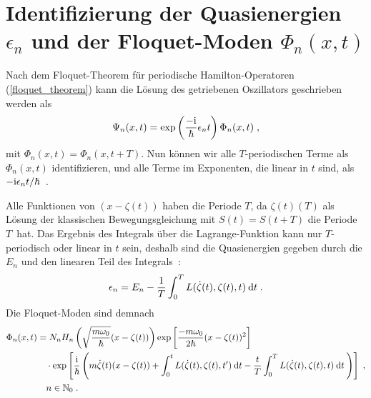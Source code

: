       \section{\texorpdfstring{Identifizierung der Quasienergien $\epsilon_n$ und der Floquet-Moden $\Phi_n(x,t)$}{Identifizierung der Quasienergien epsilon_n und der Floquet-Moden Phi_n(x,t)}}
        Nach dem Floquet-Theorem für periodische Hamilton-Operatoren (\ref{floquet_theorem}) kann die Lösung des getriebenen Oszillators geschrieben werden als
        \begin{equation}
          \Psi_n(x,t) = \exp\left(\frac{-\text i}{\hbar}\epsilon_nt\right)\Phi_n(x,t) \; ,
        \end{equation}
        mit $\Phi_n(x,t)=\Phi_n(x,t+T)$.
        Nun können wir alle $T$-periodischen Terme als $\Phi_n(x,t)$ identifizieren, und alle Terme im Exponenten, die linear in $t$ sind, als $-\text i\epsilon_n t/\hbar$~\cite{haengi}.

        Alle Funktionen von $(x-\zeta(t))$ haben die Periode $T$, da $\zeta(t)(T)$ als Lösung der klassischen Bewegungsgleichung mit $S(t)=S(t+T)$ die Periode $T$ \,hat. Das
        Ergebnis des Integrals über die Lagrange-Funktion kann nur $T$-periodisch oder linear in $t$ sein, deshalb sind die Quasienergien gegeben durch die $E_n$ und den linearen Teil des Integrals~\cite{haengi}:
        \begin{equation}
          \epsilon_n = E_n - \frac{1}{T} \int_0^T L(\dot \zeta(t), \zeta(t), t) \: \text d t \; .
          \label{ep}
        \end{equation}
        Die Floquet-Moden sind demnach
        \begin{align}
            \Phi_n(x,t) &=
             N_nH_n\left(\sqrt{\frac{m\omega_0}{\hbar}}(x-\zeta(t))\right) \exp\left[\frac{-m\omega_0}{2\hbar}(x-\zeta(t))^2\right] \notag\\
            &\quad \cdot \exp\left[\frac{\text i}{\hbar}\left(m\dot \zeta(t)(x-\zeta(t))+\int_0^tL(\dot \zeta(t),\zeta(t),t')\:\text d t-\frac{t}{T} \int_0^T L(\dot \zeta(t),\zeta(t),t)\:\text dt\: \right)\right] \; ,\notag\\
            &\quad n \in \mathbb{N}_0 \; .
            \label{floquet_moden_einzelner}
        \end{align}


